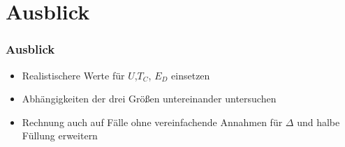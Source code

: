\section{Ausblick}

\begin{frame}
	\frametitle{ Ausblick }
	\begin{itemize}
		\item Realistischere Werte für $U$,$T_C$, $E_D$ einsetzen
		\item Abhängigkeiten der drei Größen untereinander untersuchen
		\item Rechnung auch auf Fälle ohne vereinfachende Annahmen für $\Delta$ und halbe Füllung erweitern
	\end{itemize}
\end{frame}